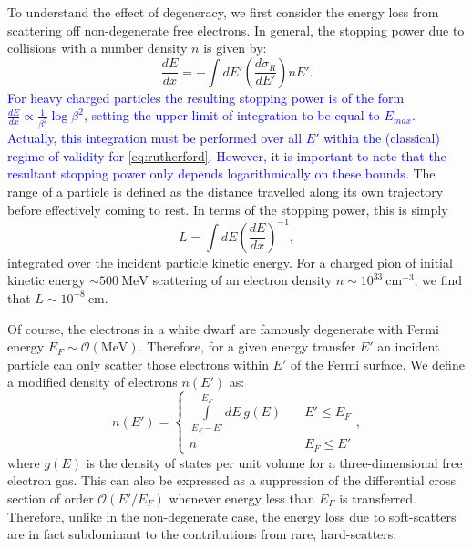 \documentclass[11 pt, preprint,preprintnumbers,amsmath,amssymb, prd]{revtex4}
\newcommand{\OO}{\mathcal{O}}
\begin{document}
To understand the effect of degeneracy, we first consider the energy loss from scattering off non-degenerate free electrons. In general, the stopping power due to collisions with a number density $n$ is given by:
\begin{equation}
\label{eq:SP}
\frac{dE}{dx} = - \int dE' \left(\frac{d \sigma_R}{dE'}\right) n E'.
\end{equation}
\textcolor{blue}{For heavy charged particles the resulting stopping power is of the form $\frac{dE}{dx} \propto \frac{1}{\beta^2} \log{\beta^2}$, setting the upper limit of integration to be equal to $E_{max}$. Actually, this integration must be performed over all $E'$ within the (classical) regime of validity for \eqref{eq:rutherford}. However, it is important to note that the resultant stopping power only depends logarithmically on these bounds.} The range of a particle is defined as the distance travelled along its own trajectory before effectively coming to rest. In terms of the stopping power, this is simply
\begin{equation}
\label{eq:range}
L = \int dE \left(\frac{dE}{dx}\right)^{-1},
\end{equation}
integrated over the incident particle kinetic energy. For a charged pion of initial kinetic energy $\sim 500 ~\text{MeV}$ scattering of an electron density $n \sim 10^{33} ~\text{cm}^{-3}$, we find that $L \sim 10^{-8} ~\text{cm}$. 

Of course, the electrons in a white dwarf are famously degenerate with Fermi energy $E_F \sim \OO(\text{MeV})$. Therefore, for a given energy transfer $E'$ an incident particle can only scatter those electrons within $E'$ of the Fermi surface. We define a modified density of electrons $n(E')$ as:
\begin{equation}
n(E') = \left\{
        \begin{array}{ll}
            \displaystyle \int \limits_{E_F -E'}^{E_F}dE ~g(E) & \quad E' \leq E_F \\
            n & \quad E_F \leq E'
        \end{array}
    \right.,
\end{equation}
where $g(E)$ is the density of states per unit volume for a three-dimensional free electron gas. This can also be expressed as a suppression of the differential cross section of order $\mathcal{O}(E'/E_F)$ whenever energy less than $E_F$ is transferred. Therefore, unlike in the non-degenerate case, the energy loss due to soft-scatters are in fact subdominant to the contributions from rare, hard-scatters. 
\end{document}
